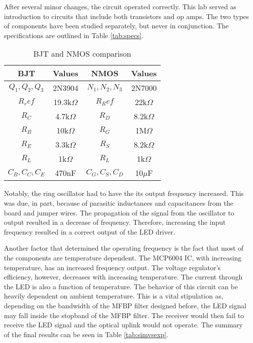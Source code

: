
After several minor changes, the circuit operated correctly. This lab served as introduction to circuits that include both transistors and op amps. The two types of components have been studied separately, but never in conjunction. The specifications are outlined in Table \ref{tab:specs}.

\begin{table}[H]
	\centering
	\caption{BJT and NMOS comparison}
	\label{my-label}
	\begin{tabular}{|c|c|c|c|}
		\hline
		BJT             & Values        & NMOS            & Values       \\ \hline
		$Q_1, Q_2, Q_3$ & 2N3904        & $N_1, N_2, N_3$ & 2N7000       \\ \hline
		$R_ref$         & 19.3k$\Omega$ & $R_Ref$         & 22k$\Omega$  \\ \hline
		$R_C$           & 4.7k$\Omega$  & $R_D$           & 8.2k$\Omega$ \\ \hline
		$R_B$           & 10k$\Omega$   & $R_G$           & 1M$\Omega$   \\ \hline
		$R_E$           & 3.3k$\Omega$  & $R_S$           & 8.2k$\Omega$ \\ \hline
		$R_L$           & 1k$\Omega$    & $R_L$           & 1k$\Omega$   \\ \hline
		$C_B, C_C, C_E$ & 470nF         & $C_G, C_S, C_D$ & 10$\mu$F     \\ \hline
	\end{tabular}
\end{table}
Notably, the ring oscillator had to have the its output frequency increased. This was due, in part, because of parasitic inductances and capacitances from the board and jumper wires. The propagation of the signal from the oscillator to output resulted in a decrease of frequency. Therefore, increasing the input frequency resulted in a correct output of the LED driver.

Another factor that determined the operating frequency is the fact that most of the components are temperature dependent. The MCP6004 IC, with increasing temperature, has an increased frequency output. The voltage regulator's efficiency, however, decreases with increasing temperature. The current through the LED is also a function of temperature. The behavior of this circuit can be heavily dependent on ambient temperature. This is a vital stipulation as, depending on the bandwidth of the MFBP filter designed before, the LED signal may fall inside the stopband of the MFBP filter. The receiver would then fail to receive the LED signal and the optical uplink would not operate. The summary of the final results can be seen in Table \ref{tab:simvsexp}.


